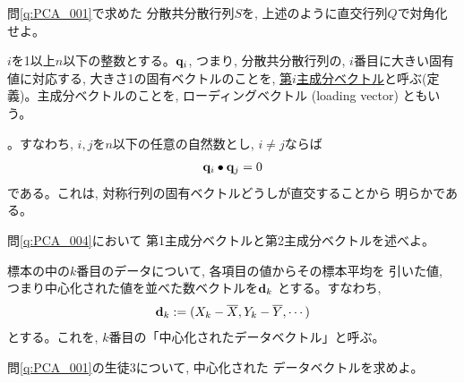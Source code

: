 \begin{q}\label{q:PCA_004} 問\ref{q:PCA_001}で求めた
分散共分散行列$S$を, 上述のように直交行列$Q$で対角化せよ。\end{q}
\mv

$i$を1以上$n$以下の整数とする。${\bf q}_i$, つまり, 分散共分散行列の, 
$i$番目に大きい固有値に対応する, 大きさ1の固有ベクトルのことを, 
\underline{第$i$主成分ベクトル}と呼ぶ(定義)。主成分ベクトルのことを, 
ローディングベクトル (loading vector)
ともいう。

。すなわち, $i, j$を$n$以下の任意の自然数とし, 
$i\neq j$ならば
\begin{eqnarray}
{\bf q}_i\bullet{\bf q}_j=0
\end{eqnarray}
である。これは, 対称行列の固有ベクトルどうしが直交することから
明らかである。\\

\begin{q}\label{q:PCA_005} 問\ref{q:PCA_004}において
第1主成分ベクトルと第2主成分ベクトルを述べよ。\end{q}
\mv


標本の中の$k$番目のデータについて, 各項目の値からその標本平均を
引いた値, つまり中心化された値を並べた数ベクトルを${\bf d}_k$
とする。すなわち, 
\begin{eqnarray}
{\bf d}_k:=(X_k-\overline{X}, Y_k-\overline{Y}, \cdots)
\end{eqnarray}
とする。これを, $k$番目の「中心化されたデータベクトル」と呼ぶ。

\begin{q}\label{q:PCA_005c} 問\ref{q:PCA_001}の生徒3について, 中心化された
データベクトルを求めよ。\end{q}

